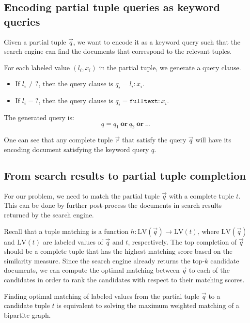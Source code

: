 \subsection{Encoding partial tuple queries as keyword queries}

Given a partial tuple $\vec q$, we want to encode it as a keyword query such that the search engine can
find the documents that correspond to the relevant tuples.

For each labeled value $(l_i, x_i)$ in the partial tuple, we generate a query clause.

\begin{itemize}
\item If $l_i\not= ?$, then the query clause is $q_i = l_i:x_i$.
\item If $l_i = ?$, then the query clause is $q_i = \mathtt{fulltext}:x_i$.
\end{itemize}

The generated query is:
$$ q = q_1\ \mathbf{or}\ q_2\ \mathbf{or}\ \dots $$

One can see that any complete tuple $\vec r$ that satisfy the query $\vec q$ will have its encoding document satisfying the keyword query $q$.

\subsection{From search results to partial tuple completion}

For our problem, we need to match the partial tuple $\vec q$ with a complete tuple $t$.  This can be done
by further post-process the documents in search results returned by the search engine. 

Recall that a tuple matching is a function $h: \mathrm{LV}(\vec q) \to \mathrm{LV}(t)$, where $\mathrm{LV}(\vec q)$ and $\mathrm{LV}(t)$ are labeled values of $\vec q$ and $t$, respectively.
The top completion of $\vec q$ should be a complete tuple that has the highest matching score based on the similarity measure.  Since the search engine already returns the top-$k$ candidate documents, we can compute the optimal matching
between $\vec q$ to each of the candidates in order to rank the candidates with respect to their matching scores.

Finding optimal matching of labeled values from the partial tuple $\vec q$ to  a candidate tuple $t$ is equivalent to solving the maximum weighted matching of a bipartite graph.

